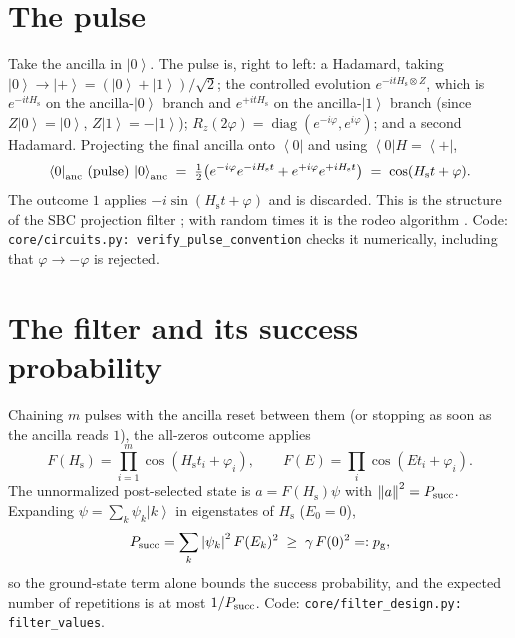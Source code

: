 \documentclass[11pt]{article}
\theoremstyle{definition}
\newcommand{\norm}[1]{\left\lVert #1\right\rVert}
\newcommand{\abs}[1]{\left\lvert #1\right\rvert}
\newcommand{\ket}[1]{\left\lvert #1\right\rangle}
\newcommand{\bra}[1]{\left\langle #1\right\rvert}
\newcommand{\Hs}{H_{\mathrm s}}
\newcommand{\pg}{p_{\mathrm g}}
\newcommand{\code}[1]{\texttt{#1}}
\begin{document}
\section{The pulse}\label{sec:pulse}
Take the ancilla in $\ket0$. The pulse is, right to left: a Hadamard, taking $\ket0\to\ket+=(\ket0+\ket1)/\sqrt2$; the
controlled evolution $e^{-it\Hs\otimes Z}$, which is $e^{-it\Hs}$ on the ancilla-$\ket0$ branch and $e^{+it\Hs}$ on the
ancilla-$\ket1$ branch (since $Z\ket0=\ket0$, $Z\ket1=-\ket1$); $R_z(2\varphi)=\operatorname{diag}(e^{-i\varphi},e^{i\varphi})$;
and a second Hadamard. Projecting the final ancilla onto $\bra0$ and using $\bra0 H=\bra+$,
\begin{equation}\label{eq:pulse}
  \bra0_{\rm anc}\,(\text{pulse})\,\ket0_{\rm anc}
  \;=\;\tfrac12\bigl(e^{-i\varphi}e^{-i\Hs t}+e^{+i\varphi}e^{+i\Hs t}\bigr)\;=\;\cos(\Hs t+\varphi).
\end{equation}
The outcome $1$ applies $-i\sin(\Hs t+\varphi)$ and is discarded. This is the structure of the SBC projection filter
\cite{sbc}; with random times it is the rodeo algorithm \cite{rodeo}. Code: \code{core/circuits.py:
verify\_pulse\_convention} checks it numerically, including that $\varphi\to-\varphi$ is rejected.

\section{The filter and its success probability}\label{sec:filter}
Chaining $m$ pulses with the ancilla reset between them (or stopping as soon as the ancilla reads $1$), the all-zeros
outcome applies
\begin{equation}
  F(\Hs)=\prod_{i=1}^m\cos(\Hs t_i+\varphi_i),\qquad F(E)=\prod_i\cos(Et_i+\varphi_i).
\end{equation}
The unnormalized post-selected state is $a=F(\Hs)\psi$ with $\norm a^2=P_{\rm succ}$. Expanding
$\psi=\sum_k\psi_k\ket k$ in eigenstates of $\Hs$ ($E_0=0$),
\begin{equation}\label{eq:psucc}
  P_{\rm succ}=\sum_k\abs{\psi_k}^2F(E_k)^2\;\ge\;\gamma\,F(0)^2=:\pg ,
\end{equation}
so the ground-state term alone bounds the success probability, and the expected number of repetitions is at most
$1/P_{\rm succ}$. Code: \code{core/filter\_design.py: filter\_values}.
\end{document}
